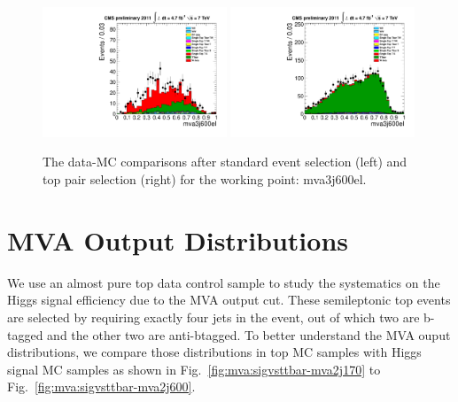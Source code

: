 \begin{figure}[!t]
  \centering
  \includegraphics[width=0.49\textwidth]{figs/cl-mva3j600el-normal.pdf}
  \includegraphics[width=0.49\textwidth]{figs/cl-mva3j600el-inTTbar.pdf}
  \caption{\label{fig:mva:plots-mva3j600el} The data-MC comparisons
    after standard event selection (left) and top pair
    selection (right) for the working point: mva3j600el.}
\end{figure}


\clearpage
\section{MVA Output Distributions}
We use an almost pure top data control sample to study the systematics
on the Higgs signal efficiency due to the MVA output cut. These
semileptonic top events are selected by requiring exactly four jets in
the event, out of which two are b-tagged and the other two are
anti-btagged. To better understand the MVA ouput distributions, we
compare those distributions in top MC samples with Higgs signal MC
samples as shown in Fig.~\ref{fig:mva:sigvsttbar-mva2j170} to
Fig.~\ref{fig:mva:sigvsttbar-mva2j600}. 

